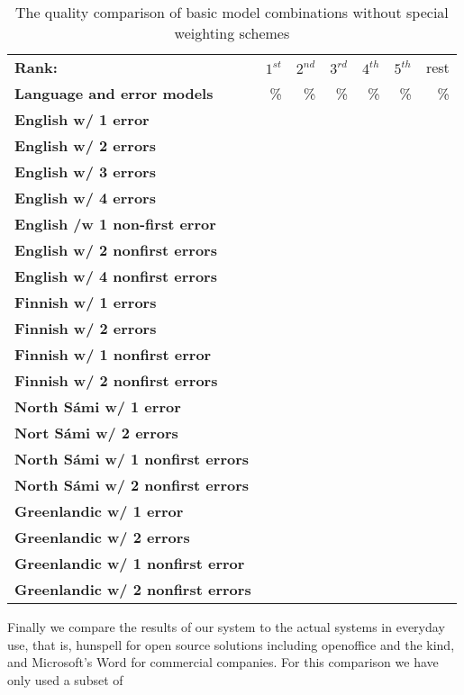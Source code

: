 \documentclass[a4paper,12pt]{article}
\begin{document}
\begin{table}
    \centering
    \begin{tabular}{|l|r|r|r|r|r|r|}
        \hline
        \bf Rank: & $1^{st}$ & $2^{nd}$ & $3^{rd}$ & $4^{th}$ & $5^{th}$ & rest \\
        \bf Language and error models &  \% & \% & \% & \% & \% & \% \\
        \hline
        \bf English w/ 1 error & & & & & & \\
     \bf English w/ 2 errors & & & & & & \\
   \bf English w/ 3 errors & & & & & & \\
          \bf English w/ 4 errors & & & & & & \\
 \bf English /w 1 non-first error & & & & & & \\
 \bf English w/ 2 nonfirst errors & & & & & & \\
 \bf English w/ 4 nonfirst errors & & & & & & \\
        \hline
        \bf Finnish w/ 1 errors & & & & & & \\
        \bf Finnish w/ 2 errors & & & & & & \\
\bf Finnish w/ 1 nonfirst error & & & & & & \\
        \bf Finnish w/ 2 nonfirst errors & & & & & & \\
        \hline
        \bf North Sámi w/ 1 error & & & & & & \\
        \bf Nort Sámi w/ 2 errors & & & & & & \\
        \bf North Sámi w/ 1 nonfirst errors & & & & & & \\
        \bf North Sámi w/ 2 nonfirst errors & & & & & & \\
        \hline
        \bf Greenlandic w/ 1 error & & & & & & \\
       \bf Greenlandic w/ 2 errors & & & & & & \\
        \bf Greenlandic w/ 1 nonfirst error & & & & & & \\
       \bf Greenlandic w/ 2 nonfirst errors & & & & & & \\
        \hline
    \end{tabular}
    \caption{The quality comparison of basic model combinations without special
    weighting schemes\label{table:distance-quality}}
\end{table}

Finally we compare the results of our system to the actual systems in everyday
use, that is, hunspell for open source solutions including openoffice and the
kind, and Microsoft's Word for commercial companies. For this comparison we
have only used a subset of 
\end{document}
